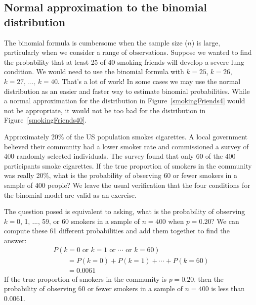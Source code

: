 

\subsection{Normal approximation to the binomial distribution}


The binomial formula is cumbersome when the sample size ($n$) is large, particularly when we consider a range of observations. Suppose we wanted to find the probability that at least 25 of 40 smoking friends will develop a severe lung condition. We would need to use the binomial formula with $k=25$, $k=26$, $k=27$, ..., $k=40$. That's a lot of work! In some cases we may use the normal distribution as an easier and faster way to estimate binomial probabilities. While a normal approximation for the distribution in Figure~\ref{smokingFriends4} would not be appropriate, it would not be too bad for the distribution in Figure~\ref{smokingFriends40}.

\begin{example}{Approximately 20\% of the US population smokes cigarettes. A local government believed their community had a lower smoker rate and commissioned a survey of 400 randomly selected individuals. The survey found that only 60 of the 400 participants smoke cigarettes. If the true proportion of smokers in the community was really 20\%, what is the probability of observing 60 or fewer smokers in a sample of 400 people?}\label{exactBinomialForN400P20SmokerExample}
We leave the usual verification that the four conditions for the binomial model are valid as an exercise.

The question posed is equivalent to asking, what is the probability of observing $k=0$, 1, ..., 59, or 60 smokers in a sample of $n=400$ when $p=0.20$? We can compute these 61 different probabilities and add them together to find the answer:
\begin{align*}
&P(k=0\text{ or }k=1\text{ or } \cdots \text{ or } k=60) \\
	&\qquad= P(k=0) + P(k=1) + \cdots + P(k=60) \\
	&\qquad=0.0061
\end{align*}
If the true proportion of smokers in the community is $p=0.20$, then the probability of observing 60 or fewer smokers in a sample of $n=400$ is less than 0.0061.
\end{example}

